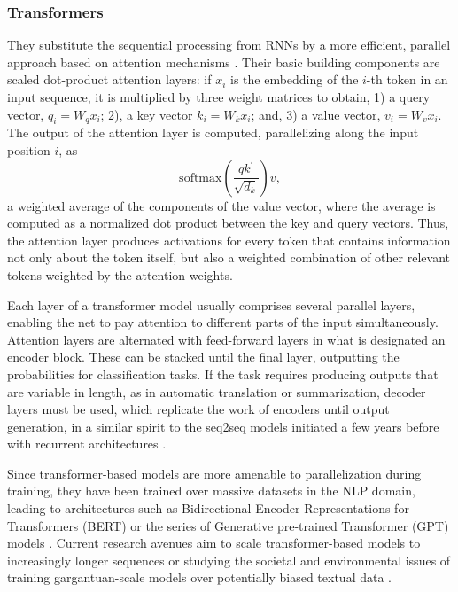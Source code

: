 \subsubsection{Transformers} They substitute the sequential processing from RNNs by a more efficient, parallel approach based on attention mechanisms \citep{vaswani2017attention,bahdanau2014neural}. Their basic building components are scaled dot-product attention layers:
if $x_i$ is the embedding of the $i$-th token in an input sequence, it is multiplied by three weight matrices to obtain, 1) a query vector, $q_i = W_q x_i$; 2), 
 a key vector $k_i = W_k x_i$;
 and, 3) a value vector, $v_i = W_v x_i$. The output of the attention layer is computed, parallelizing along the input position $i$, as
$$
\mbox{softmax}\left(\frac{q k^{'}}{\sqrt{d_k}}\right) v,
$$
 a weighted average of the components of the value vector, where the average is 
computed as a normalized dot product between the key and query vectors. Thus, the attention layer produces activations for every token  that contains information not only about the token itself, but also a weighted combination of other relevant tokens weighted by the attention weights.

Each layer of a transformer model usually comprises several 
parallel layers, enabling the net to pay attention to different parts of the input simultaneously. Attention layers are alternated with  feed-forward layers in what is designated an encoder block. These 
 can be stacked until the final layer, outputting the probabilities for classification tasks. If the task requires producing outputs that are variable in length, as in automatic translation or summarization, decoder layers must be used, which replicate the work of encoders until output generation, in a similar spirit to the seq2seq models initiated a few years before with recurrent architectures \citep{sutskever2014sequence}.

Since transformer-based models are more amenable to parallelization during training, they have been trained over massive datasets in the NLP domain, leading to architectures such as Bidirectional 
Encoder Representations for Transformers (BERT) \citep{devlin2018bert}
or the series of Generative
pre-trained Transformer (GPT) models \citep{radford2018improving, radford2019language, brown2020language}. Current research avenues aim to scale transformer-based models to increasingly longer sequences \citep{tay2020long} or studying the societal and environmental issues of training gargantuan-scale models over potentially biased textual data \citep{bender2021dangers}.

